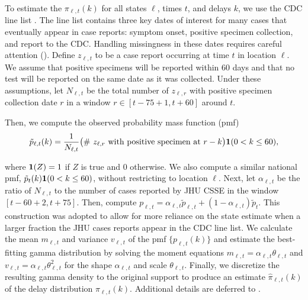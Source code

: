 
\begin{linenomath*} 
To estimate the $\pi_{\ell,t}(k)$ for all states $\ell$, times $t$, and delays
$k$, we use the CDC line list \citep{cdc2020caserestr}. The line list contains
three key dates of interest for many cases that eventually appear in case
reports: symptom onset, positive specimen collection, and report to the CDC.
Handling missingness in these dates requires careful attention
(). Define $z_{\ell,t}$ to be a case report occurring
at time $t$ in location $\ell$. We assume that positive specimens
will be reported within 60 days and that no test will be reported on the same
date as it was collected. Under these assumptions, let $N_{\ell,t}$ be the total
number of $z_{\ell,r}$ with positive specimen collection date $r$ in a window $r
\in [t-75+1, t+60]$ around $t$. 
\end{linenomath*} 
\begin{linenomath*} 
Then, we compute the observed probability mass function (pmf)
\begin{align}
  \tilde{p}_{\ell,t}(k) = \frac{1}{N_{\ell,t}} \big(\textrm{\# $z_{\ell,r}$ with positive specimen at $r-k$}\big)\mathbf{1}(0<k\leq 60),
  \label{eq:line-list-delay}
\end{align}
\end{linenomath*} 
where $\mathbf{1}(Z) = 1$ if $Z$ is true and 0 otherwise. We also compute a
similar national pmf, $\tilde{p}_{t}(k)\mathbf{1}(0<k\leq 60)$, without
restricting to location $\ell$. Next, let $\alpha_{\ell,t}$ be the ratio of
$N_{\ell,t}$ to the number of cases reported by JHU
CSSE\cite{dong2020interactive} in the window $[t-60+2, t+75]$. Then, compute
$p_{\ell,t} = \alpha_{\ell,t}\tilde{p}_{\ell,t} +
(1-\alpha_{\ell,t})\tilde{p}_t$. This construction was adopted to allow for more
reliance on the state estimate when a larger fraction the JHU cases reports
appear in the CDC line list. We calculate the mean $m_{\ell,t}$
and variance $v_{\ell,t}$ of the pmf $\{p_{\ell,t}(k)\}$ and estimate the
best-fitting gamma distribution by solving the moment equations $m_{\ell,t} =
\alpha_{\ell,t}\theta_{\ell,t}$ and $v_{\ell,t}=
\alpha_{\ell,t}\theta_{\ell,t}^2$ for the shape $\alpha_{\ell,t}$ and scale
$\theta_{\ell,t}$. Finally, we discretize the resulting gamma density to the
original support to produce an estimate $\widehat{\pi}_{\ell,t}(k)$ of the delay
distribution $\pi_{\ell,t}(k)$. Additional details are deferred to 
.
 
